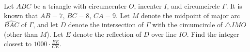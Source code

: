 Let $ABC$ be a triangle with circumcenter $O$, incenter $I$, and circumcircle $\Gamma$. It is known that $AB = 7$, $BC = 8$, $CA = 9$. Let $M$ denote the midpoint of major arc $\widehat{BAC}$ of $\Gamma$, and let $D$ denote the intersection of $\Gamma$ with the circumcircle of $\triangle IMO$ (other than $M$). Let $E$ denote the reflection of $D$ over line $IO$. Find the integer closest to $1000 \cdot \frac{BE}{CE}$.

